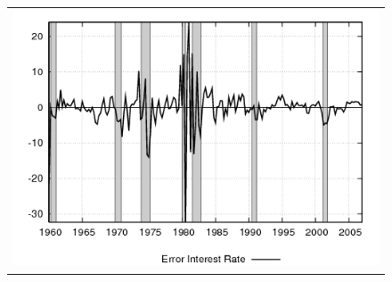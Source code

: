 \begin{figure}[ht]
\begin{center}
\begin{tabular}{c}
\includegraphics[scale=0.5]{results_cg_wlsinit/fedfunds_err.png} 
\end{tabular}
\end{center}
\end{figure}
